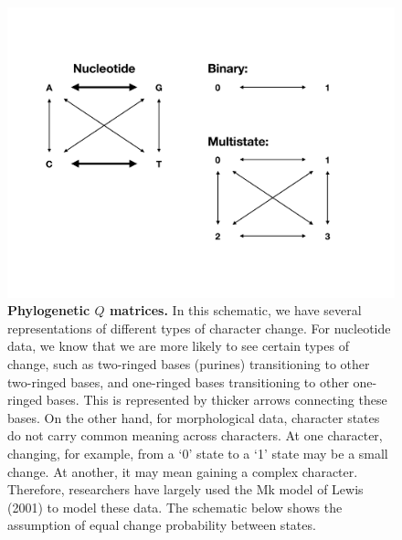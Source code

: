 \documentclass[11pt]{article}
\begin{document}
\begin{figure}
\centering
\includegraphics[width=\textwidth]{figures/Q.pdf}
\caption{\textbf{Phylogenetic $Q$ matrices.}
In this schematic, we have several representations of different types of character change.
For nucleotide data, we know that we are more likely to see certain types of change, such as two-ringed bases (purines) transitioning to other two-ringed bases, and one-ringed bases transitioning to other one-ringed bases.
This is represented by thicker arrows connecting these bases.
On the other hand, for morphological data, character states do not carry common meaning across characters.
At one character, changing, for example, from a `0' state to a `1' state may be a small change.
At another, it may mean gaining a complex character.
Therefore, researchers have largely used the Mk model of Lewis (2001) to model these data.
The schematic below shows the assumption of equal change probability between states.
}
\label{fig:Q}
\end{figure}
\end{document}
